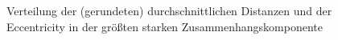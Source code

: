 \begin{figure}[th!]
  \centering
  \caption{Verteilung der (gerundeten) durchschnittlichen Distanzen 
     und der Eccentricity
     in der größten starken Zusammenhangskomponente}
  \label{fig:pathlen-dist}
\end{figure}

